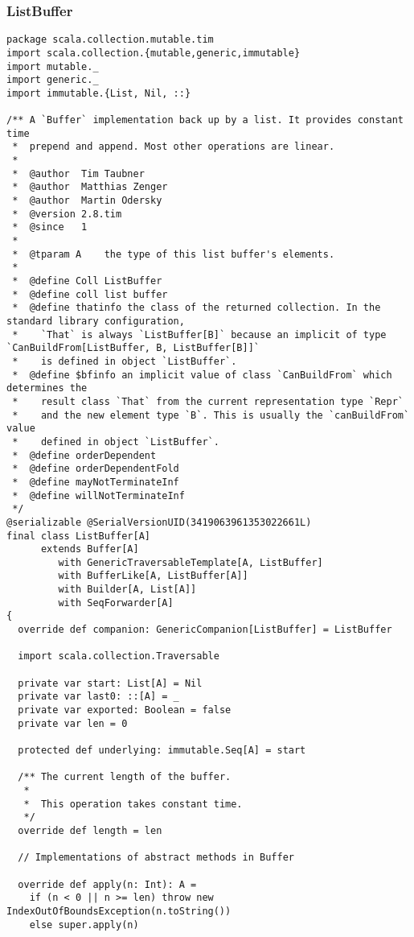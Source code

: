 \subsubsection{ListBuffer}
\begin{lstlisting}
package scala.collection.mutable.tim
import scala.collection.{mutable,generic,immutable}
import mutable._
import generic._
import immutable.{List, Nil, ::}

/** A `Buffer` implementation back up by a list. It provides constant time
 *  prepend and append. Most other operations are linear.
 *
 *  @author  Tim Taubner
 *  @author  Matthias Zenger
 *  @author  Martin Odersky
 *  @version 2.8.tim
 *  @since   1
 *
 *  @tparam A    the type of this list buffer's elements.
 *
 *  @define Coll ListBuffer
 *  @define coll list buffer
 *  @define thatinfo the class of the returned collection. In the standard library configuration,
 *    `That` is always `ListBuffer[B]` because an implicit of type `CanBuildFrom[ListBuffer, B, ListBuffer[B]]`
 *    is defined in object `ListBuffer`.
 *  @define $bfinfo an implicit value of class `CanBuildFrom` which determines the
 *    result class `That` from the current representation type `Repr`
 *    and the new element type `B`. This is usually the `canBuildFrom` value
 *    defined in object `ListBuffer`.
 *  @define orderDependent
 *  @define orderDependentFold
 *  @define mayNotTerminateInf
 *  @define willNotTerminateInf
 */
@serializable @SerialVersionUID(3419063961353022661L)
final class ListBuffer[A]
      extends Buffer[A]
         with GenericTraversableTemplate[A, ListBuffer]
         with BufferLike[A, ListBuffer[A]]
         with Builder[A, List[A]]
         with SeqForwarder[A]
{
  override def companion: GenericCompanion[ListBuffer] = ListBuffer

  import scala.collection.Traversable

  private var start: List[A] = Nil
  private var last0: ::[A] = _
  private var exported: Boolean = false
  private var len = 0

  protected def underlying: immutable.Seq[A] = start

  /** The current length of the buffer.
   *
   *  This operation takes constant time.
   */
  override def length = len

  // Implementations of abstract methods in Buffer

  override def apply(n: Int): A =
    if (n < 0 || n >= len) throw new IndexOutOfBoundsException(n.toString())
    else super.apply(n)


\end{lstlisting}
